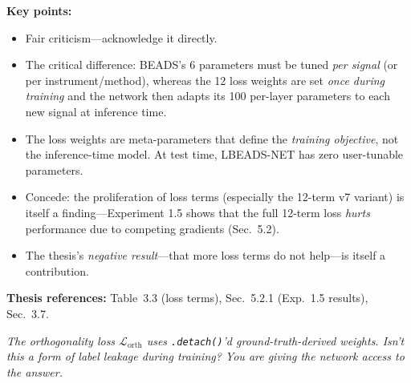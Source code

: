 \documentclass[11pt, letterpaper]{article}
\newcounter{qcounter}
\newcommand{\question}[1]{%
  \stepcounter{qcounter}%
  \begin{questionbox}[Q\theqcounter]%
    \itshape #1%
  \end{questionbox}%
}
\begin{document}
\begin{answerbox}
\textbf{Key points:}
\begin{itemize}[nosep]
  \item Fair criticism---acknowledge it directly.
  \item The critical difference: BEADS's 6 parameters must be tuned
        \emph{per signal} (or per instrument/method), whereas the
        12 loss weights are set \emph{once during training} and the
        network then adapts its 100 per-layer parameters to each new
        signal at inference time.
  \item The loss weights are meta-parameters that define the
        \emph{training objective}, not the inference-time model.
        At test time, LBEADS-NET has zero user-tunable parameters.
  \item Concede: the proliferation of loss terms (especially the
        12-term v7 variant) is itself a finding---Experiment 1.5 shows
        that the full 12-term loss \emph{hurts} performance due to
        competing gradients (Sec.~5.2).
  \item The thesis's \emph{negative result}---that more loss terms do
        not help---is itself a contribution.
\end{itemize}
\textbf{Thesis references:} Table~3.3 (loss terms), Sec.~5.2.1 (Exp.~1.5 results), Sec.~3.7.
\end{answerbox}

\question{The orthogonality loss $\mathcal{L}_{\text{orth}}$ uses
\texttt{.detach()}'d ground-truth-derived weights.  Isn't this a
form of label leakage during training?  You are giving the network
access to the answer.}
\end{document}
